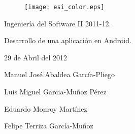 \begin{titlepage}
\begin{center}

\begin{figure}[h]
\centering
\texttt{[image: esi\_color.eps]}
\end{figure}

{\huge Ingeniería del Software II 2011-12.\\}

{\huge Desarrollo de una aplicación en Android.\\}
\end{center}

\begin{center}
29 de Abril del 2012
\end{center}

\begin{center}
{\large Manuel José Abaldea García-Pliego

Luis Miguel Garcia-Muñoz Pérez

Eduardo Monroy Martínez

Felipe Terriza García-Muñoz}
\end{center}

\end{titlepage}

